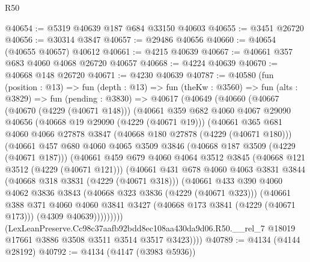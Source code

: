 \begin{lexlean}{R50}
\begin{coremodule}
@40654 := @5319 @40639 @187 @684 @33150 @40603
@40655 := @3451 @26720
@40656 := @30314 @3847
@40657 := @29486 @40656
@40660 := @40654 (@40655 @40657) @40612
@40661 := @4215 @40639
@40667 := @40661 @357 @683 @4060 @4068 @26720 @40657
@40668 := @4224 @40639
@40670 := @40668 @148 @26720
@40671 := @4230 @40639
@40787 := @40580
    (fun (position : @13) =>
    fun (depth : @13) =>
    fun (theKw : @3560) =>
    fun (alts : @3829) =>
    fun (pending : @3830) =>
    @40617
      (@40649
        (@40660
          (@40667
            (@40670 (@4229 (@40671 @148)))
            (@40661
              @359
              @682
              @4060
              @4067
              @29090
              @40656
              (@40668 @19 @29090 (@4229 (@40671 @19)))
              (@40661
                @365
                @681
                @4060
                @4066
                @27878
                @3847
                (@40668 @180 @27878 (@4229 (@40671 @180)))
                (@40661
                  @457
                  @680
                  @4060
                  @4065
                  @3509
                  @3846
                  (@40668 @187 @3509 (@4229 (@40671 @187)))
                  (@40661
                    @459
                    @679
                    @4060
                    @4064
                    @3512
                    @3845
                    (@40668 @121 @3512 (@4229 (@40671 @121)))
                    (@40661
                      @431
                      @678
                      @4060
                      @4063
                      @3831
                      @3844
                      (@40668 @318 @3831 (@4229 (@40671 @318)))
                      (@40661
                        @433
                        @390
                        @4060
                        @4062
                        @3836
                        @3843
                        (@40668 @323 @3836 (@4229 (@40671 @323)))
                        (@40661
                          @388
                          @371
                          @4060
                          @4060
                          @3841
                          @3427
                          (@40668 @173 @3841 (@4229 (@40671 @173)))
                          (@4309 @40639)))))))))
          (LexLeanPreserve.Cc98c37aafb92bdd8ec108aa430da9d06.R50.__rel_7
            @18019
            @17661
            @3886
            @3508
            @3511
            @3514
            @3517
            @3423))))
@40789 := @4134 (@4144 @28192)
@40792 := @4134 (@4147 (@3983 @5936))

\end{coremodule}
\end{lexlean}
